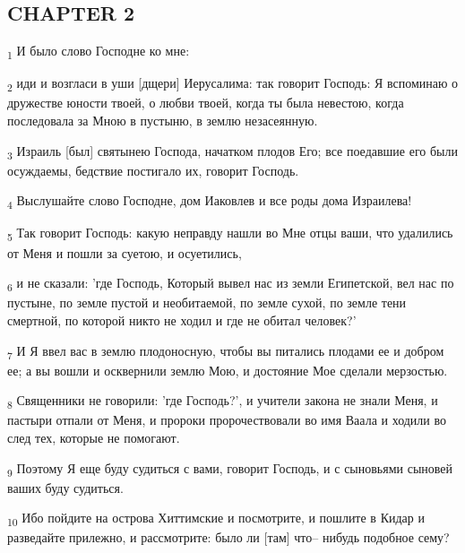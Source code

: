 \subsection{CHAPTER 2}
\begin{tcolorbox}
\textsubscript{1} И было слово Господне ко мне:
\end{tcolorbox}
\begin{tcolorbox}
\textsubscript{2} иди и возгласи в уши [дщери] Иерусалима: так говорит Господь: Я вспоминаю о дружестве юности твоей, о любви твоей, когда ты была невестою, когда последовала за Мною в пустыню, в землю незасеянную.
\end{tcolorbox}
\begin{tcolorbox}
\textsubscript{3} Израиль [был] святынею Господа, начатком плодов Его; все поедавшие его были осуждаемы, бедствие постигало их, говорит Господь.
\end{tcolorbox}
\begin{tcolorbox}
\textsubscript{4} Выслушайте слово Господне, дом Иаковлев и все роды дома Израилева!
\end{tcolorbox}
\begin{tcolorbox}
\textsubscript{5} Так говорит Господь: какую неправду нашли во Мне отцы ваши, что удалились от Меня и пошли за суетою, и осуетились,
\end{tcolorbox}
\begin{tcolorbox}
\textsubscript{6} и не сказали: 'где Господь, Который вывел нас из земли Египетской, вел нас по пустыне, по земле пустой и необитаемой, по земле сухой, по земле тени смертной, по которой никто не ходил и где не обитал человек?'
\end{tcolorbox}
\begin{tcolorbox}
\textsubscript{7} И Я ввел вас в землю плодоносную, чтобы вы питались плодами ее и добром ее; а вы вошли и осквернили землю Мою, и достояние Мое сделали мерзостью.
\end{tcolorbox}
\begin{tcolorbox}
\textsubscript{8} Священники не говорили: 'где Господь?', и учители закона не знали Меня, и пастыри отпали от Меня, и пророки пророчествовали во имя Ваала и ходили во след тех, которые не помогают.
\end{tcolorbox}
\begin{tcolorbox}
\textsubscript{9} Поэтому Я еще буду судиться с вами, говорит Господь, и с сыновьями сыновей ваших буду судиться.
\end{tcolorbox}
\begin{tcolorbox}
\textsubscript{10} Ибо пойдите на острова Хиттимские и посмотрите, и пошлите в Кидар и разведайте прилежно, и рассмотрите: было ли [там] что-- нибудь подобное сему?
\end{tcolorbox}
